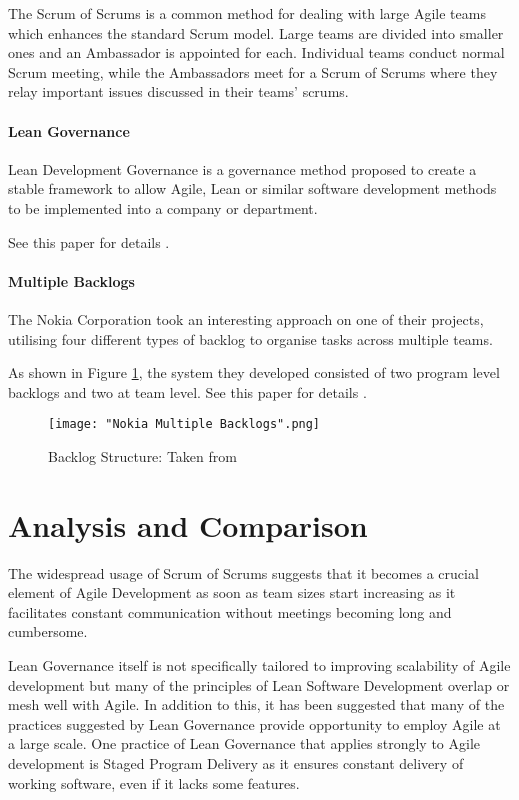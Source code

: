 \documentclass{scrartcl}
\begin{document}
The Scrum of Scrums is a common method for dealing with large Agile teams which enhances the standard Scrum model. Large teams are divided into smaller ones and an Ambassador is appointed for each. Individual teams conduct normal Scrum meeting, while the Ambassadors meet for a Scrum of Scrums where they relay important issues discussed in their teams' scrums.

\paragraph{Lean Governance}\mbox{}\newline

Lean Development Governance is a governance method proposed to create a stable framework to allow Agile, Lean or similar software development methods to be implemented into a company or department.

See this paper for details \cite{ambler2009applying}.

\paragraph{Multiple Backlogs}\mbox{}\newline

The Nokia Corporation took an interesting approach on one of their projects, utilising four different types of backlog to organise tasks across multiple teams.

As shown in Figure \ref{fig:backlogs}, the system they developed consisted of two program level backlogs and two at team level. See this paper for details \cite{laanti2008implementing}.
	
\begin{figure}
	\texttt{[image: "Nokia Multiple Backlogs".png]}
	\caption{Backlog Structure: Taken from \cite[p. ~1384]{laanti2008implementing}}
	\label{fig:backlogs}
\end{figure}


\section{Analysis and Comparison}

The widespread usage of Scrum of Scrums suggests that it becomes a crucial element of Agile Development as soon as team sizes start increasing as it facilitates constant communication without meetings becoming long and cumbersome.

Lean Governance itself is not specifically tailored to improving scalability of Agile development but many of the principles of Lean Software Development overlap or mesh well with Agile. In addition to this, it has been suggested that many of the practices suggested by Lean Governance provide opportunity to employ Agile at a large scale. \cite{ambler2009scaling} One practice of Lean Governance that applies strongly to Agile development is Staged Program Delivery as it ensures constant delivery of working software, even if it lacks some features. 
\end{document}
